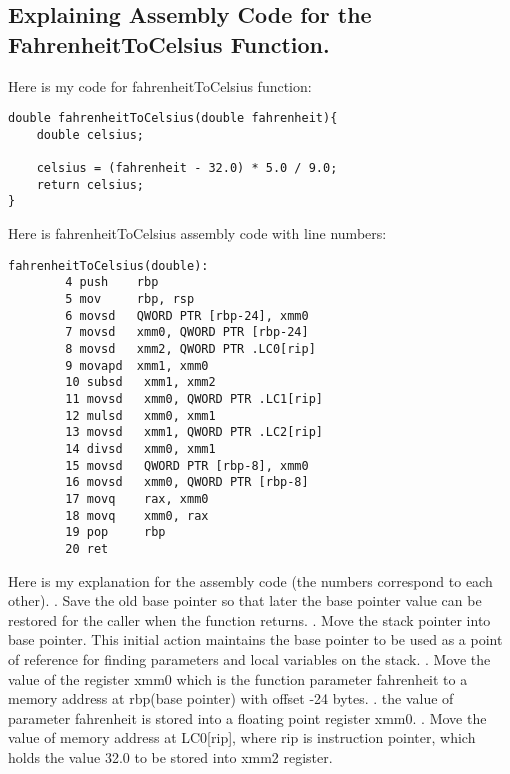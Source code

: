 \documentclass{article}
\theoremstyle{theorem}
\theoremstyle{definition}
\theoremstyle{remark}
\begin{document}
\subsection{Explaining Assembly Code for the FahrenheitToCelsius Function.}
Here is my code for fahrenheitToCelsius function:
\begin{lstlisting}
double fahrenheitToCelsius(double fahrenheit){
    double celsius;
 
    celsius = (fahrenheit - 32.0) * 5.0 / 9.0;
    return celsius;
}
\end{lstlisting}
 Here is fahrenheitToCelsius assembly code with line numbers:
\begin{lstlisting}
fahrenheitToCelsius(double):
        4 push    rbp
        5 mov     rbp, rsp
        6 movsd   QWORD PTR [rbp-24], xmm0
        7 movsd   xmm0, QWORD PTR [rbp-24]
        8 movsd   xmm2, QWORD PTR .LC0[rip]
        9 movapd  xmm1, xmm0
        10 subsd   xmm1, xmm2
        11 movsd   xmm0, QWORD PTR .LC1[rip]
        12 mulsd   xmm0, xmm1
        13 movsd   xmm1, QWORD PTR .LC2[rip]
        14 divsd   xmm0, xmm1
        15 movsd   QWORD PTR [rbp-8], xmm0
        16 movsd   xmm0, QWORD PTR [rbp-8]
        17 movq    rax, xmm0
        18 movq    xmm0, rax
        19 pop     rbp
        20 ret
\end{lstlisting}
Here is my explanation for the assembly code (the numbers correspond to each other).
\newline {}. Save the old base pointer so that later the base pointer value can be restored for the caller when the function returns.
\newline {}. Move the stack pointer into base pointer. This initial action maintains the base pointer to be used as a point of reference for finding parameters and local variables on the stack.
\newline {}. Move the value of the register xmm0 which is the function parameter fahrenheit to a memory address at rbp(base pointer) with offset -24 bytes. 
\newline {}. the value of parameter fahrenheit is stored into a floating point register xmm0.
\newline {}. Move the value of memory address at LC0[rip], where rip is instruction pointer, which holds the value 32.0 to be stored into xmm2 register.
\end{document}
